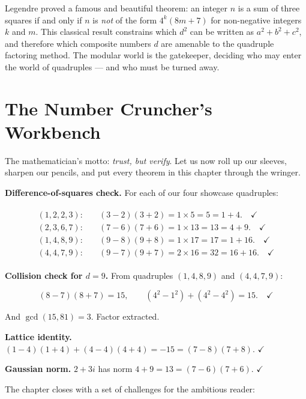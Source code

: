 \documentclass[11pt,twoside,openright]{book}
\theoremstyle{definition}
\theoremstyle{remark}
\begin{document}
Legendre proved a famous and beautiful theorem: an integer $n$ is a sum of three squares if and only if $n$ is \textit{not} of the form $4^k(8m + 7)$ for non-negative integers $k$ and $m$. This classical result constrains which $d^2$ can be written as $a^2 + b^2 + c^2$, and therefore which composite numbers $d$ are amenable to the quadruple factoring method. The modular world is the gatekeeper, deciding who may enter the world of quadruples --- and who must be turned away.



\section{The Number Cruncher's Workbench}

The mathematician's motto: \textit{trust, but verify}. Let us now roll up our sleeves, sharpen our pencils, and put every theorem in this chapter through the wringer.

\textbf{Difference-of-squares check.} For each of our four showcase quadruples:

\begin{align*}
\begin{aligned}
(1,2,2,3): &\quad (3-2)(3+2) = 1 \times 5 = 5 = 1 + 4. \quad \checkmark \\
(2,3,6,7): &\quad (7-6)(7+6) = 1 \times 13 = 13 = 4 + 9. \quad \checkmark \\
(1,4,8,9): &\quad (9-8)(9+8) = 1 \times 17 = 17 = 1 + 16. \quad \checkmark \\
(4,4,7,9): &\quad (9-7)(9+7) = 2 \times 16 = 32 = 16 + 16. \quad \checkmark
\end{aligned}
\end{align*}

\textbf{Collision check for $d = 9$.} From quadruples $(1,4,8,9)$ and $(4,4,7,9)$:

\[(8-7)(8+7) = 15, \qquad (4^2 - 1^2) + (4^2 - 4^2) = 15. \quad \checkmark\]

And $\gcd(15, 81) = 3$. Factor extracted.

\textbf{Lattice identity.} $(1-4)(1+4) + (4-4)(4+4) = -15 = (7-8)(7+8)$. $\checkmark$

\textbf{Gaussian norm.} $2 + 3i$ has norm $4 + 9 = 13 = (7-6)(7+6)$. $\checkmark$


The chapter closes with a set of challenges for the ambitious reader:
\end{document}
